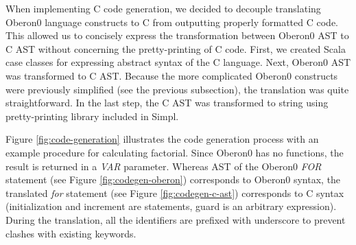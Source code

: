 When implementing C code generation, we decided to decouple translating
Oberon0 language constructs to C from outputting properly formatted
C code. This allowed us to concisely express the transformation between
Oberon0 AST to C AST without concerning the pretty-printing of C code.
First, we created Scala case classes for expressing abstract syntax
of the C language. Next, Oberon0 AST was transformed to C AST. Because
the more complicated Oberon0 constructs were previously simplified
(see the previous subsection), the translation was quite straightforward.
In the last step, the C AST was transformed to string using pretty-printing
library included in Simpl.

Figure \ref{fig:code-generation} illustrates the code generation
process with an example procedure for calculating factorial. Since
Oberon0 has no functions, the result is returned in a \emph{VAR} parameter.
Whereas AST of the Oberon0 \emph{FOR} statement (see Figure \ref{fig:codegen-oberon})
corresponds to Oberon0 syntax, the translated \emph{for} statement
(see Figure \ref{fig:codegen-c-ast}) corresponds to C syntax (initialization
and increment are statements, guard is an arbitrary expression). During
the translation, all the identifiers are prefixed with underscore
to prevent clashes with existing keywords.

